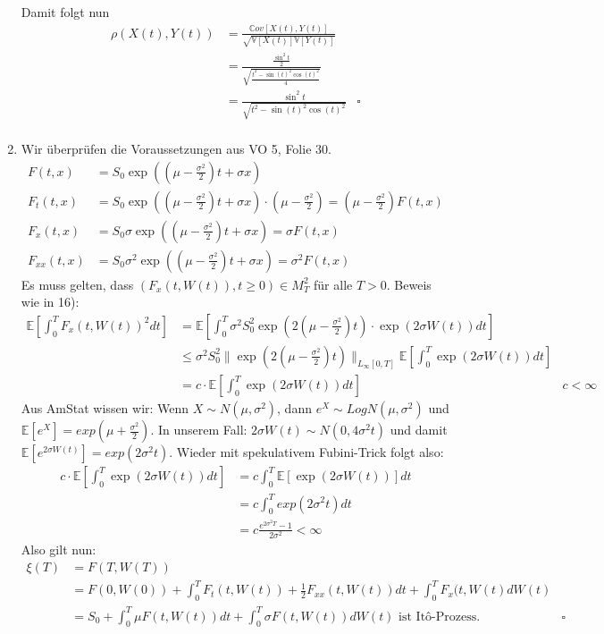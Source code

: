 \documentclass[a4paper,11pt,notitlepage,fullpage]{article}
\newcommand{\Ee}[1]{\mathbb E\left[#1\right]}
\newcommand{\Vv}[1]{\mathbb V\left[#1\right]}
\newcommand{\Cov}[1]{\mathbb Cov\left[#1\right]}
\begin{document}
\begin{enumerate}
Damit folgt nun
\begin{align*}
\rho(X(t), Y(t)) &= \frac{\Cov{X(t), Y(t)}}{\sqrt{\Vv{X(t)}\Vv{Y(t)}}} \\
&= \frac{\frac{\sin^2t}{2}}{\sqrt{ \frac{t^2 - \sin(t)^2\cos(t)^2}{4} }} \\
&= \frac{\sin^2t}{\sqrt{ t^2 - \sin(t)^2\cos(t)^2}}  &\square\\
\end{align*}

\item Wir überprüfen die Voraussetzungen aus VO 5, Folie 30.
\begin{align*}
F(t, x) &= S_0 \exp\left(\left(\mu - \frac{\sigma^2}{2}\right)t + \sigma x\right) \\
F_t(t, x) &= S_0 \exp\left(\left(\mu - \frac{\sigma^2}{2}\right)t + \sigma x\right) \cdot \left(\mu - \frac{\sigma^2}{2}\right) = \left(\mu - \frac{\sigma^2}{2}\right) F(t, x)\\
F_x(t, x) &= S_0 \sigma \exp\left(\left(\mu - \frac{\sigma^2}{2}\right)t + \sigma x\right) = \sigma F(t, x) \\
F_{xx}(t, x) &= S_0 \sigma^2 \exp\left(\left(\mu - \frac{\sigma^2}{2}\right)t + \sigma x\right) = \sigma^2 F(t, x)
\end{align*}
Es muss gelten, dass $(F_x(t, W(t)), t \geq 0) \in M_T^2$ für alle $T > 0$. Beweis wie in 16):
\begin{align*}
\Ee{\int_0^T F_x(t, W(t))^2 dt} &= \Ee{\int_0^T \sigma^2 S_0^2 \exp(2(\mu - \frac{\sigma^2}{2}) t) \cdot \exp(2\sigma W(t)) dt} \\
&\leq  \sigma^2 S_0^2 \|\exp(2(\mu - \frac{\sigma^2}{2}) t)\|_{L_\infty[0, T]} \Ee{\int _0^T \exp(2\sigma W(t)) dt} \\
&= c \cdot \Ee{\int _0^T \exp(2\sigma W(t)) dt} &c < \infty
\end{align*}
Aus AmStat wissen wir: Wenn $X\sim N(\mu, \sigma^2)$, dann $e^X \sim LogN(\mu, \sigma^2)$ und $\Ee{e^X} = exp(\mu + \frac{\sigma^2}{2})$. In unserem Fall: $2\sigma W(t) \sim N(0, 4\sigma^2 t)$ und damit $\Ee{e^{2\sigma W(t)}} =  exp(2\sigma^2 t)$. Wieder mit spekulativem Fubini-Trick folgt also:
\begin{align*}
c \cdot \Ee{\int _0^T \exp(2\sigma W(t)) dt} &= c \int _0^T \Ee{\exp(2\sigma W(t))} dt \\
&= c \int _0^T exp(2\sigma^2 t) dt \\
&= c \frac{e^{2\sigma^2 T}-1}{2\sigma^2} < \infty
\end{align*}
Also gilt nun:
\begin{align*}
\xi(T) &= F(T, W(T)) \\
&= F(0, W(0)) + \int_0^T F_t(t, W(t)) + \frac{1}{2} F_{xx}(t, W(t)) dt + \int_0^T F_x(t, W(t) dW(t) \\
&= S_0 + \int_0^T \mu F(t, W(t)) dt + \int_0^T \sigma F(t, W(t)) dW(t) \text{ ist Itô-Prozess.}&\square
\end{align*}


\end{enumerate}
\end{document}
